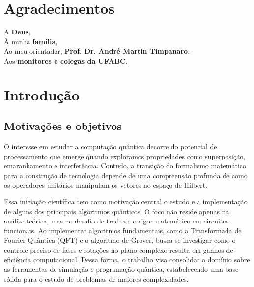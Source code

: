 \documentclass[12pt, a4paper]{article}
\begin{document}
\clearpage
\tableofcontents

\clearpage
\section*{Agradecimentos}

\vspace{1.5cm}

\begin{flushleft}
    A \textbf{Deus}, \\[1cm]
    
    À minha \textbf{família}, \\[1cm]
    
    Ao meu orientador, \textbf{Prof. Dr. André Martin Timpanaro}, \\[1cm]
    
    Aos \textbf{monitores e colegas da UFABC}.
\end{flushleft}

\clearpage
\section{Introdução}

\subsection{Motivações e objetivos}

O interesse em estudar a computação quântica decorre do potencial de processamento que emerge quando exploramos propriedades como superposição, emaranhamento e interferência. Contudo, a transição do formalismo matemático para a construção de tecnologia depende de uma compreensão profunda de como os operadores unitários manipulam os vetores no espaço de Hilbert.

Essa iniciação científica tem como motivação central o estudo e a implementação de alguns dos principais algoritmos quânticos. O foco não reside apenas na análise teórica, mas no desafio de traduzir o rigor matemático em circuitos funcionais. Ao implementar algoritmos fundamentais, como a Transformada de Fourier Quântica (QFT) e o algoritmo de Grover, busca-se investigar como o controle preciso de fases e rotações no plano complexo resulta em ganhos de eficiência computacional. Dessa forma, o trabalho visa consolidar o domínio sobre as ferramentas de simulação e programação quântica, estabelecendo uma base sólida para o estudo de problemas de maiores complexidades.
\end{document}
